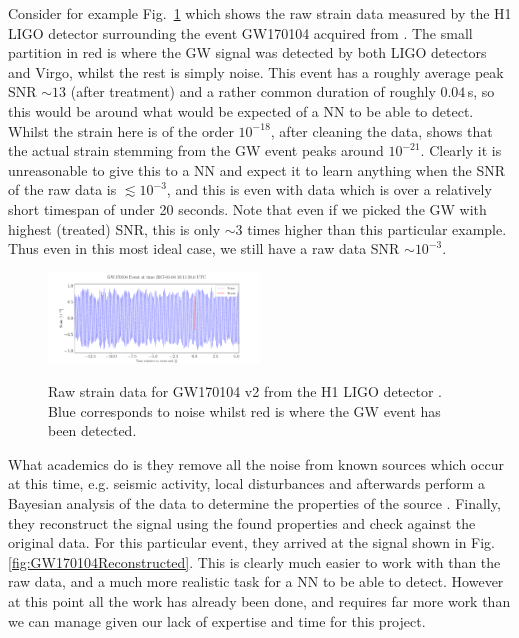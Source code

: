 \documentclass[%
reprint,
amsmath,amssymb,
aps,
]{revtex4-2}
\begin{document}
Consider for example Fig.~\ref{fig:GW170104GWEvent} which shows the raw strain data measured by the H1 LIGO detector surrounding the event GW170104 acquired from \cite{gwosc}. The small partition in red is where the GW signal was detected by both LIGO detectors and Virgo, whilst the rest is simply noise. This event has a roughly average peak SNR $\sim13$ (after treatment) and a rather common duration of roughly $0.04\,$s, so this would be around what would be expected of a NN to be able to detect. Whilst the strain here is of the order $10^{-18}$, after cleaning the data, \cite{LIGOScientific:2017bnn} shows that the actual strain stemming from the GW event peaks around $10^{-21}$. Clearly it is unreasonable to give this to a NN and expect it to learn anything when the SNR of the raw data is $\lesssim10^{-3}$, and this is even with data which is over a relatively short timespan of under 20 seconds. Note that even if we picked the GW with highest (treated) SNR, this is only $\sim3$ times higher than this particular example. Thus even in this most ideal case, we still have a raw data SNR $\sim10^{-3}$.

\begin{figure}[ht!]
	\includegraphics[width=0.5\textwidth]{Figures/GW170104GWEvent.pdf}
	\label{fig:GW170104GWEvent}
	\caption{Raw strain data for GW170104 v2 from the H1 LIGO detector \cite{gwosc}. Blue corresponds to noise whilst red is where the GW event has been detected.}
\end{figure}

What academics do is they remove all the noise from known sources which occur at this time, e.g. seismic activity, local disturbances and afterwards perform a Bayesian analysis of the data to determine the properties of the source \cite{LIGOScientific:2017bnn}. Finally, they reconstruct the signal using the found properties and check against the original data. For this particular event, they arrived at the signal shown in Fig. \ref{fig:GW170104Reconstructed}. This is clearly much easier to work with than the raw data, and a much more realistic task for a NN to be able to detect. However at this point all the work has already been done, and requires far more work than we can manage given our lack of expertise and time for this project.
\end{document}
